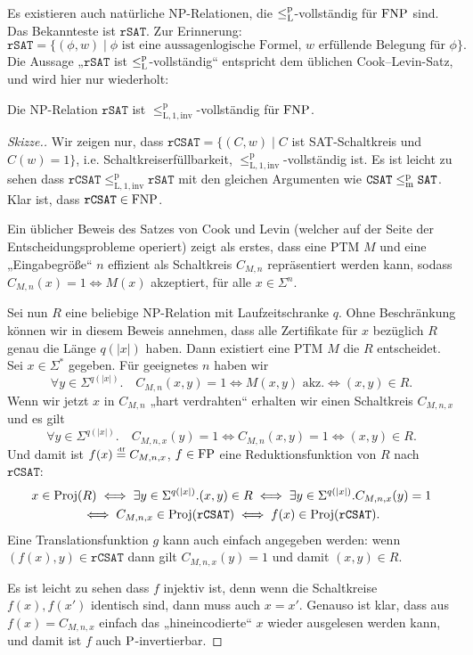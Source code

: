 Es existieren auch natürliche NP-Relationen, die $\leqlp$-vollständig für $\FNP$ sind.
Das Bekannteste ist $\mathtt{rSAT}$. Zur Erinnerung:
\[ \mathtt{rSAT} = \{ (\phi, w) \mid \text{$\phi$ ist eine aussagenlogische Formel, $w$ erfüllende Belegung für $\phi$} \}. \]
Die Aussage „$\mathtt{rSAT}$ ist $\leqlp$-vollständig“ entspricht dem üblichen Cook--Levin-Satz, und wird hier nur wiederholt:
\begin{theorem}
    Die NP-Relation $\mathtt{rSAT}$ ist $\leq_\mathrm{L,1,inv}^\mathrm p$-vollständig für $\FNP$.
\end{theorem}
\begin{proof}[Skizze.]
    Wir zeigen nur, dass $\mathtt{rCSAT}=\{(C, w) \mid C$ ist SAT-Schaltkreis und $C(w)=1\}$, i.e. Schaltkreiserfüllbarkeit, $\leq_\mathrm{L,1,inv}^\mathrm p$-vollständig ist. Es ist leicht zu sehen dass $\mathtt{rCSAT}\leq_\mathrm{L,1,inv}^\mathrm p \mathtt{rSAT}$ mit den gleichen Argumenten wie $\mathtt{CSAT}\leqmp \mathtt{SAT}$. Klar ist, dass $\mathtt{rCSAT}\in\FNP$.

    Ein üblicher Beweis des Satzes von Cook und Levin (welcher auf der Seite der Entscheidungsprobleme operiert) zeigt als erstes, dass eine PTM $M$ und eine „Eingabegröße“ $n$ effizient als Schaltkreis $C_{M,n}$ repräsentiert werden kann, sodass $C_{M,n}(x)=1 \iff M(x)$ akzeptiert, für alle $x\in\Sigma^{n}$.

    Sei nun $R$ eine beliebige NP-Relation mit Laufzeitschranke $q$. Ohne Beschränkung können wir in diesem Beweis annehmen, dass alle Zertifikate für $x$ bezüglich $R$ genau die Länge $q(|x|)$ haben. Dann existiert eine PTM $M$ die $R$ entscheidet. Sei $x\in\Sigma^*$ gegeben. Für geeignetes $n$ haben wir
    \[ \forall y\in\Sigma^{q(|x|)}.\quad C_{M,n}(x,y)=1 \iff M(x,y)\text{ akz.} \iff (x,y)\in R. \]
    Wenn wir jetzt $x$ in $C_{M,n}$ „hart verdrahten“ erhalten wir einen Schaltkreis $C_{M,n,x}$ und es gilt
    \[ \forall y\in\Sigma^{q(|x|)}.\quad C_{M,n,x}(y)=1 \iff C_{M,n}(x,y)=1 \iff (x,y)\in R. \]
    Und damit ist $f(x) \defeq C_{M,n,x}$, $f\in\FP$ eine Reduktionsfunktion von $R$ nach $\mathtt{rCSAT}$:
    \begin{gather*}
    x\in \Proj(R) \iff \exists  y\in\Sigma^{q(|x|)}.(x,y)\in R \iff \exists y\in\Sigma^{q(|x|)}.C_{M,n,x}(y)=1 \\\iff C_{M,n,x}\in\Proj(\mathtt{rCSAT}) \iff f(x)\in\Proj(\mathtt{rCSAT}). \end{gather*}
    Eine Translationsfunktion $g$ kann auch einfach angegeben werden: wenn $(f(x), y)\in \mathtt{rCSAT}$ dann gilt $C_{M,n,x}(y)=1$ und damit  $(x,y)\in R$.

    Es ist leicht zu sehen dass $f$ injektiv ist, denn wenn die Schaltkreise $f(x), f(x')$ identisch sind, dann muss auch $x=x'$. Genauso ist klar, dass aus $f(x)=C_{M,n,x}$ einfach das „hineincodierte“ $x$ wieder ausgelesen werden kann, und damit ist $f$ auch $\P$-invertierbar.
\end{proof}


